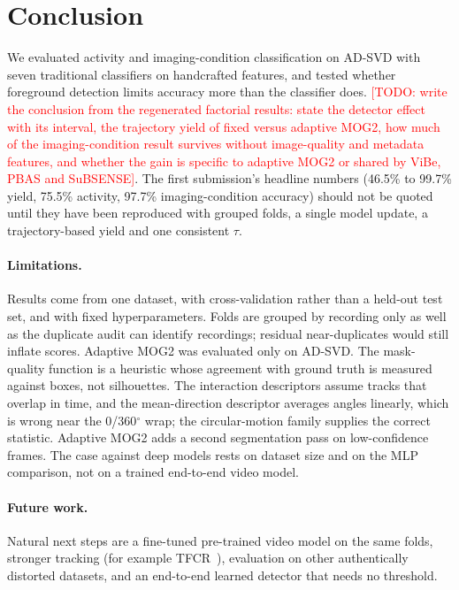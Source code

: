 \documentclass[runningheads]{llncs}
\newcommand{\todo}[1]{\textcolor{red}{[TODO: #1]}}
\begin{document}
\section{Conclusion}

We evaluated activity and imaging-condition classification on AD-SVD with seven traditional classifiers on
handcrafted features, and tested whether foreground detection limits accuracy more than the classifier does.
\todo{write the conclusion from the regenerated factorial results: state the detector effect with its interval,
the trajectory yield of fixed versus adaptive MOG2, how much of the imaging-condition result survives without
image-quality and metadata features, and whether the gain is specific to adaptive MOG2 or shared by ViBe, PBAS and
SuBSENSE}. The first submission's headline numbers (46.5\% to 99.7\% yield, 75.5\% activity, 97.7\%
imaging-condition accuracy) should not be quoted until they have been reproduced with grouped folds, a single
model update, a trajectory-based yield and one consistent $\tau$.

\paragraph{Limitations.}
Results come from one dataset, with cross-validation rather than a held-out test set, and with fixed
hyperparameters. Folds are grouped by recording only as well as the duplicate audit can identify recordings;
residual near-duplicates would still inflate scores. Adaptive MOG2 was evaluated only on AD-SVD. The
mask-quality function is a heuristic whose agreement with ground truth is measured against boxes, not silhouettes.
The interaction descriptors assume tracks that overlap in time, and the mean-direction descriptor averages angles
linearly, which is wrong near the 0/360$^\circ$ wrap; the circular-motion family supplies the correct statistic. Adaptive
MOG2 adds a second segmentation pass on low-confidence frames. The case against deep models rests on dataset size and
on the MLP comparison, not on a trained end-to-end video model.

\paragraph{Future work.}
Natural next steps are a fine-tuned pre-trained video model on the same folds, stronger tracking (for example
TFCR~\cite{yuan2020learning}), evaluation on other authentically distorted datasets, and an end-to-end learned
detector that needs no threshold.
\end{document}
